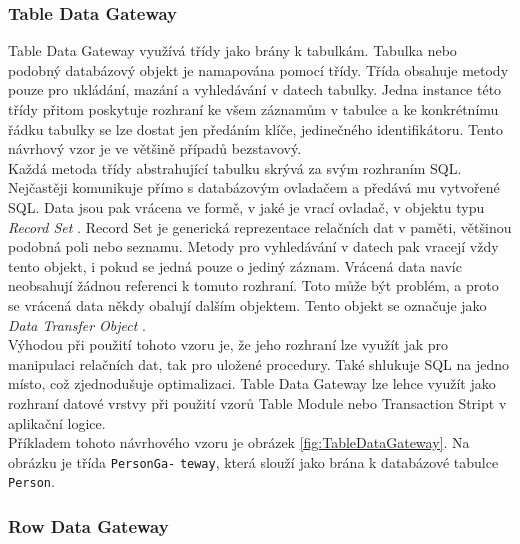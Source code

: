 \documentclass[ing,male,java,dept456]{diploma}						%
\begin{document}
\subsubsection{Table Data Gateway}

Table Data Gateway využívá třídy jako brány k tabulkám. Tabulka nebo podobný databázový objekt je namapována pomocí třídy. Třída obsahuje metody pouze pro ukládání, mazání a vyhledávání v datech tabulky. Jedna instance této třídy přitom poskytuje rozhraní ke všem záznamům v tabulce a ke konkrétnímu řádku tabulky se lze dostat jen předáním klíče, jedinečného identifikátoru. Tento návrhový vzor je ve většině případů bezstavový. \\
Každá metoda třídy abstrahující tabulku skrývá za svým rozhraním SQL. Nejčastěji komunikuje přímo s databázovým ovladačem a předává mu vytvořené SQL. Data jsou pak vrácena ve formě, v jaké je vrací ovladač, v objektu typu \textit{Record Set} \cite{fowler}. Record Set je generická reprezentace relačních dat v paměti, většinou podobná poli nebo seznamu. Metody pro vyhledávání v datech pak vracejí vždy tento objekt, i pokud se jedná pouze o jediný záznam. Vrácená data navíc neobsahují žádnou referenci k tomuto rozhraní. Toto může být problém, a proto se vrácená data někdy obalují dalším objektem. Tento objekt se označuje jako \textit{Data Transfer Object} \cite{fowler}. \\
Výhodou při použití tohoto vzoru je, že jeho rozhraní lze využít jak pro manipulaci relačních dat, tak pro uložené procedury. Také shlukuje SQL na jedno místo, což zjednodušuje optimalizaci. Table Data Gateway lze lehce využít jako rozhraní datové vrstvy při použití vzorů Table Module nebo Transaction Stript v aplikační logice. \\
Příkladem tohoto návrhového vzoru je obrázek \ref{fig:TableDataGateway}. Na obrázku je třída \lstinline[style=inlinepython]|PersonGa-| \lstinline[style=inlinepython]|teway|, která slouží jako brána k databázové tabulce \lstinline[style=inlinepython]|Person|.


\subsubsection{Row Data Gateway}
\end{document}
